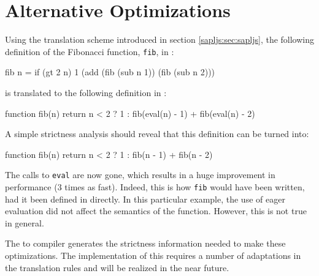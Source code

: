 \section{Alternative Optimizations}
\label{sapljs:sec:optimizations}
Using the translation scheme introduced in section \ref{sapljs:sec:sapljs}, the following 
definition of the Fibonacci function, \texttt{fib}, in \Sapl:
\begin{CleanCode}
fib n = if (gt 2 n) 1 (add (fib (sub n 1)) (fib (sub n 2)))
\end{CleanCode} 
is translated to the following definition in \JS:
\begin{CleanCode}
function fib(n) {
    return n < 2 ? 1 : fib(eval(n) - 1) + fib(eval(n) - 2)
}
\end{CleanCode}
A simple strictness analysis should reveal that this definition can be turned into:
\begin{CleanCode}
function fib(n) {
    return n < 2 ? 1 : fib(n - 1) + fib(n - 2)
}
\end{CleanCode}
The calls to \texttt{eval} are now gone, which results in a huge improvement in performance (3 times as fast). Indeed,
this is how \texttt{fib} would have been written, had it been defined in \JavaScript
directly. In this particular example, the use of eager evaluation did not affect
the semantics of the function.  However, this is not true in general. 

The \Clean to \Sapl compiler generates the strictness information needed to make these 
optimizations. The implementation of this requires a number of adaptations in the translation rules
and will be realized in the near future.

